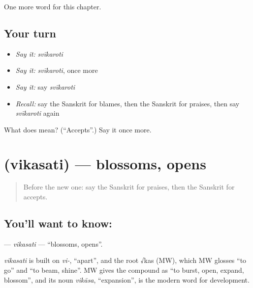 \begin{grammarlens}[title={What you've built}]
One more word for this chapter.
\end{grammarlens}

\subsection*{Your turn}
\begin{itemize}
\raggedright
  \item \emph{Say it:} \emph{svīkaroti}
  \item \emph{Say it:} \emph{svīkaroti}, once more
  \item \emph{Say it:} say \emph{svīkaroti}
  \item \emph{Recall:} say the Sanskrit for blames, then the Sanskrit for praises, then say \emph{svīkaroti} again
\end{itemize}

\begin{tcolorbox}[breakable,colback=teal!4,colframe=teal!35!black,title={Before you move on}]
What does  mean? (\textquotedblleft{}Accepts\textquotedblright{}.) Say it once more.
\end{tcolorbox}
\section[\texorpdfstring{\sk{विकसति} (vikasati)}{विकसति (vikasati)}]{ (vikasati) — blossoms, opens}

\label{lesson:SA-C205-vikasati}



\begin{quote}
Before the new one: say the Sanskrit for praises, then the Sanskrit for accepts.
\end{quote}

\subsection*{You'll want to know: }
\textbf{} — \emph{vikasati} — \textquotedblleft{}blossoms, opens\textquotedblright{}.

\begin{cousinweb}
\emph{vikasati} is built on \emph{vi-}, \textquotedblleft{}apart\textquotedblright{}, and the root √kas (MW), which MW glosses \textquotedblleft{}to go\textquotedblright{} and \textquotedblleft{}to beam, shine\textquotedblright{}. MW gives the compound as \textquotedblleft{}to burst, open, expand, blossom\textquotedblright{}, and its noun \emph{vikāsa}, \textquotedblleft{}expansion\textquotedblright{}, is the modern word for development.
\end{cousinweb}

